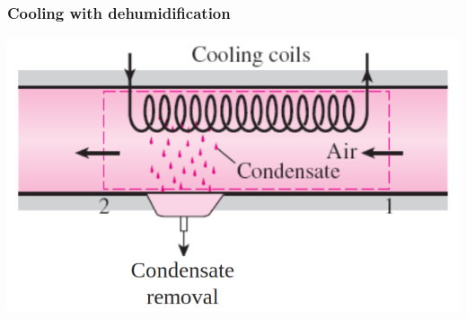 \documentclass[11pt]{article}
\begin{document}
 \newpage
\subsubsection{Cooling with dehumidification}
\label{sec:orgf0256d0}
\begin{center}
\includegraphics[scale=0.5]{./images/cooling-with-dehumidification-diagram.png}
\end{center}
\end{document}
